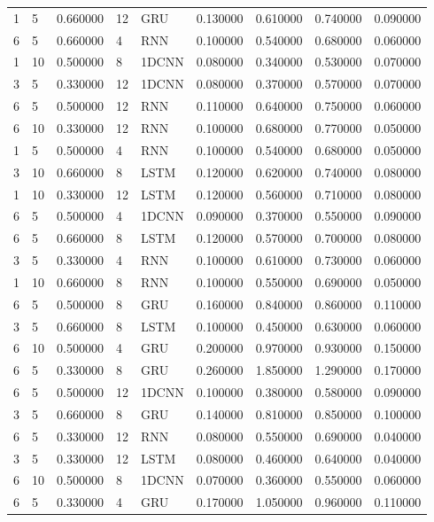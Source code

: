 \begin{tabular}{llrllrrrr}
1 & 5 & 0.660000 & 12 & GRU & 0.130000 & 0.610000 & 0.740000 & 0.090000 \\
6 & 5 & 0.660000 & 4 & RNN & 0.100000 & 0.540000 & 0.680000 & 0.060000 \\
1 & 10 & 0.500000 & 8 & 1DCNN & 0.080000 & 0.340000 & 0.530000 & 0.070000 \\
3 & 5 & 0.330000 & 12 & 1DCNN & 0.080000 & 0.370000 & 0.570000 & 0.070000 \\
6 & 5 & 0.500000 & 12 & RNN & 0.110000 & 0.640000 & 0.750000 & 0.060000 \\
6 & 10 & 0.330000 & 12 & RNN & 0.100000 & 0.680000 & 0.770000 & 0.050000 \\
1 & 5 & 0.500000 & 4 & RNN & 0.100000 & 0.540000 & 0.680000 & 0.050000 \\
3 & 10 & 0.660000 & 8 & LSTM & 0.120000 & 0.620000 & 0.740000 & 0.080000 \\
1 & 10 & 0.330000 & 12 & LSTM & 0.120000 & 0.560000 & 0.710000 & 0.080000 \\
6 & 5 & 0.500000 & 4 & 1DCNN & 0.090000 & 0.370000 & 0.550000 & 0.090000 \\
6 & 5 & 0.660000 & 8 & LSTM & 0.120000 & 0.570000 & 0.700000 & 0.080000 \\
3 & 5 & 0.330000 & 4 & RNN & 0.100000 & 0.610000 & 0.730000 & 0.060000 \\
1 & 10 & 0.660000 & 8 & RNN & 0.100000 & 0.550000 & 0.690000 & 0.050000 \\
6 & 5 & 0.500000 & 8 & GRU & 0.160000 & 0.840000 & 0.860000 & 0.110000 \\
3 & 5 & 0.660000 & 8 & LSTM & 0.100000 & 0.450000 & 0.630000 & 0.060000 \\
6 & 10 & 0.500000 & 4 & GRU & 0.200000 & 0.970000 & 0.930000 & 0.150000 \\
6 & 5 & 0.330000 & 8 & GRU & 0.260000 & 1.850000 & 1.290000 & 0.170000 \\
6 & 5 & 0.500000 & 12 & 1DCNN & 0.100000 & 0.380000 & 0.580000 & 0.090000 \\
3 & 5 & 0.660000 & 8 & GRU & 0.140000 & 0.810000 & 0.850000 & 0.100000 \\
6 & 5 & 0.330000 & 12 & RNN & 0.080000 & 0.550000 & 0.690000 & 0.040000 \\
3 & 5 & 0.330000 & 12 & LSTM & 0.080000 & 0.460000 & 0.640000 & 0.040000 \\
6 & 10 & 0.500000 & 8 & 1DCNN & 0.070000 & 0.360000 & 0.550000 & 0.060000 \\
6 & 5 & 0.330000 & 4 & GRU & 0.170000 & 1.050000 & 0.960000 & 0.110000 \\

\end{tabular}
